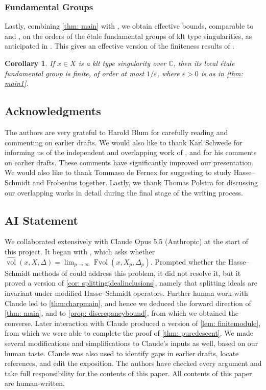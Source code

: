 \documentclass[11pt,leqno]{amsart}
\numberwithin{equation}{section}
\newtheorem{corollary}[theorem]{Corollary}
\theoremstyle{definition}
\theoremstyle{remark}
\newcommand{\C}{\mathbb{C}}
\newcommand{\vol}{\operatorname{vol}}
\begin{document}
\subsubsection*{Fundamental Groups} Lastly, combining \cref{thm: main} with \cite[Corollary 3.5]{crst18}, we obtain effective bounds, comparable to \cite[Theorem B]{JS22} and \cite[Corollary 1.4]{xz21}, on the orders of the \'etale fundamental groups of klt type singularities, as anticipated in \cite[Section 5]{crst18}. This gives an effective version of the finiteness results of \cite{xu14, bgo17}.


\begin{corollary} \label{cor: localfundgroups} If $x \in X$ is a klt type singularity over $\C$, then its local \'etale fundamental group is finite, of order at most $1/\varepsilon$, where $\varepsilon > 0$ is as in \cref{thm: main1}.
\end{corollary}







\subsection*{Acknowledgments}
The authors are very grateful to Harold Blum for carefully reading and commenting on earlier drafts. We would also like to thank Karl Schwede for informing us of the independent and overlapping work of \cite{LuoPolstra26}, and for his comments on earlier drafts. These comments have significantly improved our presentation. We would also like to thank Tommaso de Fernex  for suggesting to study Hasse--Schmidt and Frobenius together. Lastly, we thank Thomas Polstra for discussing our overlapping works in detail during the final stage of the writing process. 

\subsection*{AI Statement}   We collaborated extensively with Claude Opus 5.5 (Anthropic) at the start of this project. It began with \cite[Problem 46]{xu2026openproblemskstabilityfano}, which asks whether $\widehat{\vol}(x, X, \Delta) = \lim_{p \to \infty} \operatorname{Fvol}(x, X_p, \Delta_p)$. Prompted whether the Hasse--Schmidt methods of \cite{rahulmatthewbertini} could address this problem, it did not resolve it, but it proved a version of \cref{cor: splittingidealinclusions}, namely that splitting ideals are invariant under modified Hasse--Schmidt operators. Further human work with Claude led to \cref{thm:charpmain}, and hence we deduced the forward direction of \cref{thm: main}, and to \cref{prop: discrepancybound}, from which we obtained the converse. Later interaction with Claude produced a version of \cref{lem: finitemodule}, from which we were able to complete the proof of \cref{thm: puredescent}. We made several modifications and simplifications to Claude's inputs as well, based on our human taste. Claude was also used to identify gaps in earlier drafts, locate references, and edit the exposition. The authors have checked every argument and take full responsibility for the contents of this paper. All contents of this paper are human-written. 
\end{document}
